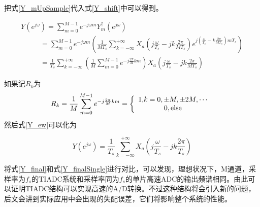 \begin{enumerate}
			把式\ref{Y_mUpSample}代入式\ref{Y_shift}中可以得到。
				
				\begin{equation}
					\begin{array}{l}
Y({e^{j\omega }}) = \sum\limits_{m = 0}^{M - 1} {{e^{ - j\omega m}}} Y_m^ \uparrow \left( {{e^{j\omega }}} \right)\\
\quad \quad \;\;\, = \sum\limits_{m = 0}^{M - 1} {{e^{ - j\omega m}}\left( {\frac{1}{{M{T_s}}}\sum\limits_{k =  - \infty }^{ + \infty } {{X_a}\left( {j\frac{\omega }{{{T_s}}} - jk\frac{{2\pi }}{{M{T_s}}}} \right)} {e^{j\left( {\frac{\omega }{{{T_s}}} - k\frac{{2\pi }}{{M{T_s}}}} \right)m{T_s}}}} \right)} \\
\quad \quad \;\;\, = \frac{1}{{{T_s}}}\sum\limits_{k =  - \infty }^{ + \infty } {\left( {\frac{1}{M}\sum\limits_{m = 0}^{M - 1} {{e^{ - j\frac{{2\pi }}{M}km}}} } \right)} {X_a}\left( {j\frac{\omega }{{{T_s}}} - jk\frac{{2\pi }}{{M{T_s}}}} \right)
\end{array} \label{Y_ew}
				\end{equation}
			
			如果记$R_k$为
			\begin{equation}
				{R_k} = \frac{1}{M}\sum\limits_{m = 0}^{M - 1} {{e^{ - j\frac{{2\pi }}{M}km}}}  = \left\{ {\begin{array}{*{20}{c}}
{1{\rm{   ,}}k = 0, \pm M, \pm 2M, \cdots }\\
{0{\rm{  ,else                   }}}
\end{array}} \right.{\rm{   }}
			\end{equation}
		然后式\ref{Y_ew}可以化为
		
			\begin{equation}
				Y({e^{j\omega }}) = \frac{1}{{{T_s}}}\sum\limits_{k =  - \infty }^{ + \infty } {{X_a}\left( {j\frac{\omega }{{{T_s}}} - jk\frac{{2\pi }}{{{T_s}}}} \right)}  \label{Y_final}
			\end{equation}
		
		将式\ref{Y_final}和式\ref{Y_finalSingle}进行对比，可以发现，理想状况下，M通道，采样率为$f_s$的TIADC系统和采样率同为$f_s$的单片高速ADC的输出频谱相同。由此可以证明TIADC结构可以实现高速的A/D转换。不过这种结构将会引入新的问题，后文会讲到实际应用中会出现的失配误差，它们将影响整个系统的性能。	
		\end{enumerate}
